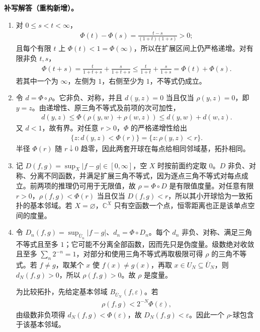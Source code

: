 \documentclass[../../main.tex]{subfiles}%
\begin{document}
\begin{solution}
\textbf{补写解答（重构新增）。}
\begin{enumerate}
\item 对 $0\le s<t<\infty$，
\begin{align*}
\Phi(t)-\Phi(s)=\frac{t-s}{(1+t)(1+s)}>0;
\end{align*}
且每个有限 $t$ 上 $\Phi(t)<1=\Phi(\infty)$，所以在扩展区间上仍严格递增。对有限非负 $t,s$，
\begin{align*}
\Phi(t+s)=\frac{t}{1+t+s}+\frac{s}{1+t+s}
\le\frac{t}{1+t}+\frac{s}{1+s}=\Phi(t)+\Phi(s).
\end{align*}
若其中一个为 $\infty$，左侧为 $1$，右侧至少为 $1$，不等式仍成立。
\item 令 $d=\Phi\circ\rho$。它非负、对称，并且 $d(y,z)=0$ 当且仅当 $\rho(y,z)=0$，即 $y=z$。由递增性、原三角不等式及前项的次可加性，
\begin{align*}
d(y,z)\le\Phi(\rho(y,w)+\rho(w,z))
\le d(y,w)+d(w,z).
\end{align*}
又 $d<1$，故有界。对任意 $r>0$，$\Phi$ 的严格递增性给出
\begin{align*}
\{z:d(y,z)<\Phi(r)\}=\{z:\rho(y,z)<r\}.
\end{align*}
半径 $\Phi(r)$ 随 $r\downarrow0$ 趋零，因此两套开球在每点给相同邻域基，拓扑相同。
\item 记 $D(f,g)=\sup_X|f-g|\in[0,\infty]$，空 $X$ 时按前面约定取 $0$。$D$ 非负、对称、分离不同函数，并满足扩展三角不等式，因为逐点三角不等式对每点成立。前两项的推理仍可用于无限值，故 $\rho=\Phi\circ D$ 是有限值度量。对任意有限 $r>0$，$\rho(f,g)<\Phi(r)$ 当且仅当 $D(f,g)<r$，所以其小开球恰为一致拓扑的基本邻域。若 $X=\varnothing$，$\mathbb C^X$ 只有空函数一个点，恒零距离也正是该单点空间的度量。
\item 令 $D_n(f,g)=\sup_{\overline U_n}|f-g|$、$d_n=\Phi\circ D_n$。每个 $d_n$ 非负、对称、满足三角不等式且至多 $1$；它可能不分离全部函数，因而先只是伪度量。级数绝对收敛且至多 $\sum_n2^{-n}=1$，对部分和使用三角不等式再取极限可得 $\rho$ 的三角不等式。若 $f\ne g$，取某个 $x$ 使 $f(x)\ne g(x)$，再取 $x\in U_N\subseteq\overline U_N$，则 $d_N(f,g)>0$，所以 $\rho(f,g)>0$。故 $\rho$ 是度量。

为比较拓扑，先给定基本邻域 $B_{\overline U_N}(f,\varepsilon)$。若
\begin{align*}
\rho(f,g)<2^{-N}\Phi(\varepsilon),
\end{align*}
由级数非负项得 $d_N(f,g)<\Phi(\varepsilon)$，故 $D_N(f,g)<\varepsilon$。因此一个 $\rho$-球包含于该基本邻域。


\end{enumerate}
\end{solution}
\end{document}
